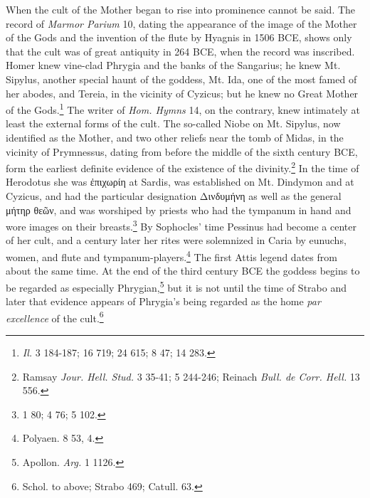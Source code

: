 \documentclass[a4paper, 11pt, oneside, polutonikogreek, french]{article}
\begin{document}
When the cult of the Mother began to rise into prominence cannot be said. The record of \emph{Marmor Parium} 10, dating the appearance of the image of the Mother of the Gods and the invention of the flute by Hyagnis in 1506 \textsc{BCE}, shows only that the cult was of great antiquity in 264 \textsc{BCE}, when the record was inscribed. Homer knew vine-clad Phrygia and the banks of the Sangarius; he knew Mt. Sipylus, another special haunt of the goddess, Mt. Ida, one of the most famed of her abodes, and Tereia, in the vicinity of Cyzicus; but he knew no Great Mother of the Gods.\footnote{\emph{Il.} 3 184-187; 16 719; 24 615; 8 47; 14 283.} The writer of \emph{Hom. Hymns} 14, on the contrary, knew intimately at least the external forms of the cult. The so-called Niobe on Mt. Sipylus, now identified as the Mother, and two other reliefs near the tomb of Midas, in the vicinity of Prymnessus, dating from before the middle of the sixth century \textsc{BCE}, form the earliest definite evidence of the existence of the divinity.\footnote{Ramsay \emph{Jour. Hell. Stud.} 3 35-41; 5 244-246; Reinach \emph{Bull. de Corr. Hell.} 13 556.} In the time of Herodotus she was ἐπιχωρίη at Sardis, was established on Mt. Dindymon and at Cyzicus, and had the particular designation Δινδυμήνη as well as the general μήτηρ θεῶν, and was worshiped by priests who had the tympanum in hand and wore images on their breasts.\footnote{1 80; 4 76; 5 102.} By Sophocles' time Pessinus had become a center of her cult, and a century later her rites were solemnized in Caria by eunuchs, women, and flute and tympanum-players.\footnote{Polyaen. 8 53, 4.} The first Attis legend dates from about the same time. At the end of the third century \textsc{BCE} the goddess begins to be regarded as especially Phrygian,\footnote{Apollon. \emph{Arg.} 1 1126.} but it is not until the time of Strabo and later that evidence appears of Phrygia's being regarded as the home \emph{par excellence} of the cult.\footnote{Schol. to above; Strabo 469; Catull. 63.}
\end{document}
